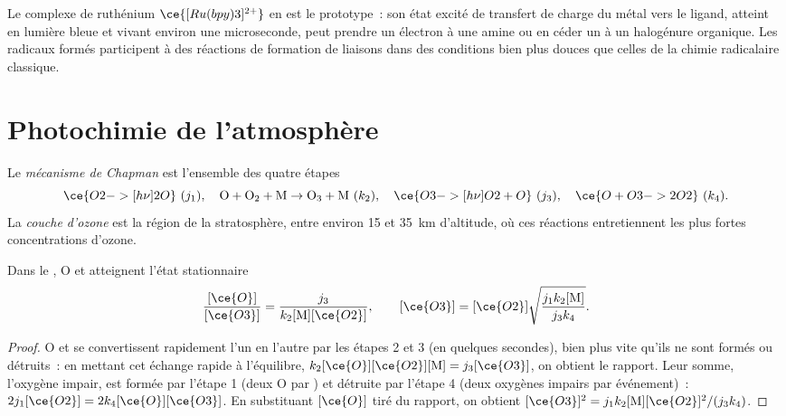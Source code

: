 Le complexe de ruthénium $\ce{[Ru(bpy)3]^{2+}}$ en est le prototype~: son
état excité de transfert de charge du métal vers le ligand, atteint en
lumière bleue et vivant environ une microseconde, peut prendre un
électron à une amine ou en céder un à un halogénure organique. Les
radicaux formés participent à des réactions de formation de liaisons
dans des conditions bien plus douces que celles de la chimie radicalaire
classique.

\section{Photochimie de l'atmosphère}

\begin{definition}\label{def:b3:photochemistry:chapman}
Le \emph{mécanisme de Chapman} est l'ensemble des quatre étapes
\[
  \ce{O2 ->[h\nu] 2 O}\ (j_1), \quad \mathrm{O + O_2 + M \to O_3 + M}\ (k_2), \quad
  \ce{O3 ->[h\nu] O2 + O}\ (j_3), \quad \ce{O + O3 -> 2 O2}\ (k_4).
\]
La \emph{couche d'ozone} est la région de la
stratosphère, entre environ
15 et \qty{35}{km} d'altitude, où ces réactions entretiennent les plus
fortes concentrations d'ozone.
\end{definition}

\begin{theorem}\label{thm:b3:photochemistry:chapman}
Dans le , O et  atteignent l'état stationnaire
\[
  \frac{[\ce{O}]}{[\ce{O3}]} = \frac{j_3}{k_2[\mathrm M][\ce{O2}]}, \qquad
  [\ce{O3}] = [\ce{O2}]\sqrt{\frac{j_1k_2[\mathrm M]}{j_3k_4}} .
\]
\end{theorem}

\begin{proof}
O et  se convertissent rapidement l'un en l'autre par les étapes
2 et 3 (en quelques secondes), bien plus vite qu'ils ne sont formés ou
détruits~: en mettant cet échange rapide à l'équilibre,
$k_2[\ce{O}][\ce{O2}][\mathrm M] = j_3[\ce{O3}]$, on obtient le rapport.
Leur somme, l'oxygène impair, est formée par
l'étape 1 (deux O par ) et détruite par l'étape 4 (deux oxygènes
impairs par événement)~:
$2j_1[\ce{O2}] = 2k_4[\ce{O}][\ce{O3}]$. En substituant $[\ce{O}]$ tiré
du rapport, on obtient $[\ce{O3}]^2 = j_1k_2[\mathrm M][\ce{O2}]^2/(j_3k_4)$.
\end{proof}

